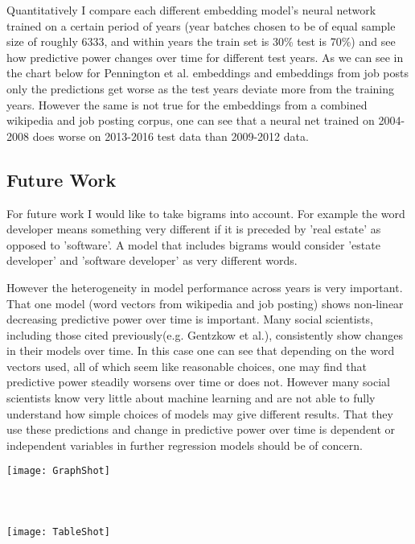 \documentclass[11pt, oneside]{article}   	%
\begin{document}
Quantitatively I compare each different embedding model's neural network trained on a certain period of years (year batches chosen to be of equal sample size of roughly 6333, and within years the train set is 30\% test is 70\%) and see how predictive power changes over time for different test years. As we can see in the chart below for Pennington et al. embeddings and embeddings from job posts only the predictions get worse as the test years deviate more from the training years. However the same is not true for the embeddings from a combined wikipedia and job posting corpus, one can see that a neural net trained on 2004-2008 does worse on 2013-2016 test data than 2009-2012 data.




\subsection{Future Work}

For future work I would like to take bigrams into account. For example the word developer means something very different if it is preceded by 'real estate' as opposed to 'software'. A model that includes bigrams would consider 'estate developer' and 'software developer' as very different words. 

However the heterogeneity in model performance across years is very important. That one model (word vectors from wikipedia and job posting) shows non-linear decreasing predictive power over time is important. Many social scientists, including those cited previously(e.g. Gentzkow et al.), consistently show changes in their models over time. In this case one can see that depending on the word vectors used, all of which seem like reasonable choices, one may find that predictive power steadily worsens over time or does not. However many social scientists know very little about machine learning and are not able to fully understand how simple choices of models may give different results. That they use these predictions and change in predictive power over time is dependent or independent variables in further regression models should be of concern.


\graphicspath{ {/Users/adrianapaza/Desktop/} }

\texttt{[image: GraphShot]}
\\
\\
\\
\\
\texttt{[image: TableShot]}
\end{document}

